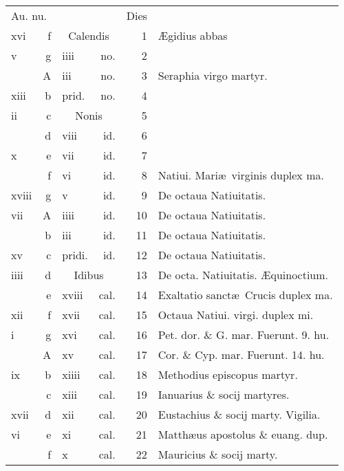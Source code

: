 \documentclass[a5paper,10pt]{book}
\def\ae{æ}
\def\AE{Æ}
\begin{document}
\begin{center}
\begin{tabular}{l r l r r l}
\multicolumn{2}{l}{\color{red}Au. nu.} & & & \color{red} Dies & \\
xvi & f & \multicolumn{2}{c}{\color{red} Calendis} & 1 & \AE gidius abbas \\
v & g & iiii & no. & 2 & \\
 & \color{red} A & iii & no. & 3 & Seraphia virgo martyr. \\
xiii & b & \color{red} prid. & no. & 4 & \\
ii & c & \multicolumn{2}{c}{\color{red} Nonis} & 5 & \\
 & d & viii & id. & 6 & \\
x & e & vii & id. & 7 & \\
 & f & vi & id. & 8 & \color{red} Natiui. Mari\ae \ virginis duplex ma. \color{black} \\
xviii & g & v & id. & 9 & De octaua Natiuitatis. \\
vii & \color{red} A & iiii & id. & 10 & De octaua Natiuitatis. \\
 & b & iii & id. & 11 & De octaua Natiuitatis. \\
xv & c & \color{red} pridi. & id. & 12 & De octaua Natiuitatis. \\
iiii & d & \multicolumn{2}{c}{\color{red} Idibus} & 13 & De octa. Natiuitatis. \color{red} \AE quinoctium. \color{black} \\
 & e & xviii & cal. & 14 & \color{red} Exaltatio sanct\ae \ Crucis duplex ma. \color{black} \\%
xii & f & xvii & cal. & 15 & \color{red} Octaua Natiui. virgi. duplex mi. \color{black} \\
i & g & xvi & cal. & 16 & Pet. dor. \& G. mar. \color{red} Fuerunt. 9. hu.\color{black} \\
 & \color{red} A & xv & cal. & 17 & Cor. \& Cyp. mar. \color{red} Fuerunt. 14. hu. \color{black} \\
ix & b & xiiii & cal. & 18 & Methodius episcopus martyr. \\
 & c & xiii & cal. & 19 & Ianuarius \& socij martyres. \\
xvii & d & xii & cal. & 20 & Eustachius \& socij marty. \color{red} Vigilia. \\
vi & e & xi & cal. & 21 & \color{red} Matth\ae us apostolus \& euang. dup. \color{black} \\
 & f & x & cal. & 22 & Mauricius \& socij marty. \\

\end{tabular}
\end{center}
\end{document}
